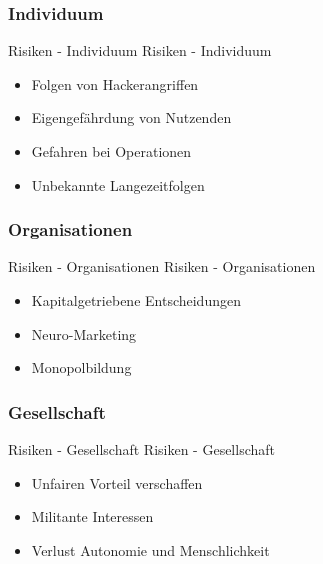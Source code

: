 \documentclass[aspectratio=169,16pt,xcolor=table]{beamer}
\begin{document}
\subsubsection{Individuum}
\begin{frame}{Risiken - Individuum}
Risiken - Individuum
	\begin{itemize}
		\item{Folgen von Hackerangriffen~\cite{khan_aziz_2019}}
		\item{Eigengefährdung von Nutzenden~\cite{khan_aziz_2019}}
		\item{Gefahren bei Operationen~\cite{Burwell:2017aa}}
		\item{Unbekannte Langezeitfolgen~\cite{Burwell:2017aa}}
	\end{itemize}
\end{frame}

\subsubsection{Organisationen}
\begin{frame}{Risiken - Organisationen}
Risiken - Organisationen
	\begin{itemize}
		\item{Kapitalgetriebene Entscheidungen~\cite{khan_aziz_2019}}
		\item{Neuro-Marketing~\cite{khan_aziz_2019}}
		\item{Monopolbildung~\cite{khan_aziz_2019}}
	\end{itemize}
\end{frame}

\subsubsection{Gesellschaft}
\begin{frame}{Risiken - Gesellschaft}
Risiken - Gesellschaft
	\begin{itemize}
		\item{Unfairen Vorteil verschaffen~\cite{khan_aziz_2019}}
		\item{Militante Interessen~\cite{khan_aziz_2019}}
		\item{Verlust Autonomie und Menschlichkeit~\cite{Burwell:2017aa}}
	\end{itemize}
\end{frame}

\newpage
\printbibliography %
\end{document}
